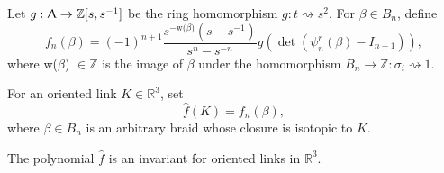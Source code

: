 Let $g: \Uplambda \to \mathbb{Z}[s, s^{-1}]$ be the ring homomorphism $g: t \rightsquigarrow s^2$. For $\beta \in B_n$, define
\begin{displaymath}
f_n(\beta) = (-1)^{n+1} \frac{s^{-\text{w($\beta$)}} (s-s^{-1})}{s^n-s^{-n}} g(\det(\psi^r_n(\beta) - I_{n-1})),
\end{displaymath}
where w($\beta$) $\in \mathbb{Z}$ is the image of $\beta$ under the homomorphism $B_n \to \mathbb{Z} : \sigma_i \rightsquigarrow 1$.

For an oriented link $K \in \mathbb{R}^3$, set 
\begin{displaymath}
  \hat{f}(K) = f_n(\beta),
\end{displaymath}
where $\beta \in B_n$ is an arbitrary braid whose closure is isotopic to $K$.

\begin{theorem}
The polynomial $\hat{f}$ is an invariant for oriented links in $\mathbb{R}^3$.
\end{theorem}
  
